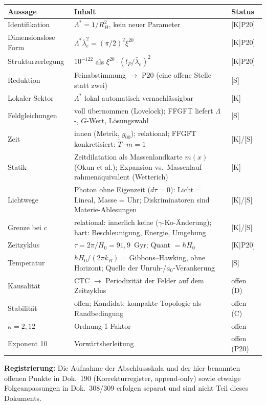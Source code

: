 \documentclass[11pt]{report}
\begin{document}
\begin{center}
\begin{tabular}{lp{6.5cm}l}
\toprule
Aussage & Inhalt & Status \\
\midrule
Identifikation & $\Lambda^{*} = 1/R_H^2$, kein neuer Parameter
  & [K|P20] \\
Dimensionslose Form & $\Lambda^{*}\bar\lambda_e^2 = (\pi/2)^2\xi^{20}$
  & [K|P20] \\
Strukturzerlegung & $10^{-122}$ als $\xi^{20}\cdot(l_P/\bar\lambda_e)^2$
  & [K|P20] \\
Reduktion & Feinabstimmung $\to$ P20 (eine offene Stelle statt zwei)
  & [S] \\
Lokaler Sektor & $\Lambda^{*}$ lokal automatisch vernachlässigbar
  & [K] \\
Feldgleichungen & voll übernommen (Lovelock); FFGFT liefert
  $\Lambda$-, $G$-Wert, Lösungswahl & [S] \\
Zeit & innen (Metrik, $g_{00}$); relational; FFGFT konkretisiert:
  $\tilde T \cdot m = 1$ & [K]/[S] \\
Statik & Zeitdilatation als Massenlandkarte $m(x)$ (Okun et al.);
  Expansion vs.\ Massenlauf rahmenäquivalent (Wetterich) & [K] \\
Lichtwege & Photon ohne Eigenzeit ($d\tau=0$): Licht = Lineal,
  Masse = Uhr; Diskriminatoren sind Materie-Ablesungen & [K]/[S] \\
Grenze bei $c$ & relational: innerlich keine ($\gamma$-Ko-Änderung);
  hart: Beschleunigung, Energie, Umgebung & [K]/[S] \\
Zeitzyklus & $\tau = 2\pi/H_0 = 91{,}9$~Gyr; Quant $= \hbar H_0$
  & [K|P20] \\
Temperatur & $\hbar H_0/(2\pi k_B)$ = Gibbons--Hawking, ohne
  Horizont; Quelle der Unruh-/$a_0$-Verankerung & [S] \\
Kausalität & CTC $\to$ Periodizität der Felder auf dem Zeitzyklus
  & offen (D) \\
Stabilität & offen; Kandidat: kompakte Topologie als Randbedingung
  & offen (C) \\
$\kappa = 2{,}12$ & Ordnung-1-Faktor & offen \\
Exponent 10 & Vorwärtsherleitung & offen (P20) \\
\bottomrule
\end{tabular}
\end{center}

\medskip
\noindent\textbf{Registrierung:} Die Aufnahme der Abschlussskala und
der hier benannten offenen Punkte in Dok.~190 (Korrekturregister,
append-only) sowie etwaige Folgeanpassungen in Dok.~308/309 erfolgen
separat und sind nicht Teil dieses Dokuments.
\end{document}
